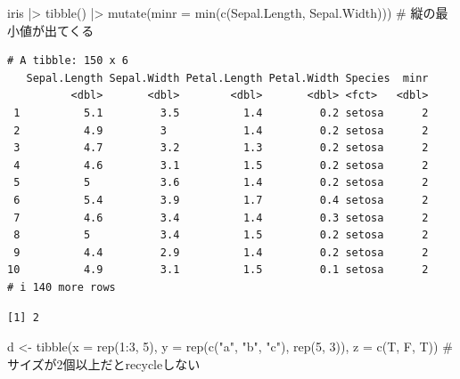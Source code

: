 \documentclass[
  letterpaper,
  DIV=11,
  numbers=noendperiod]{scrreprt}
\newenvironment{Shaded}{\begin{snugshade}}{\end{snugshade}}
\newcommand{\AttributeTok}[1]{\textcolor[rgb]{0.40,0.45,0.13}{#1}}
\newcommand{\CommentTok}[1]{\textcolor[rgb]{0.37,0.37,0.37}{#1}}
\newcommand{\DecValTok}[1]{\textcolor[rgb]{0.68,0.00,0.00}{#1}}
\newcommand{\FunctionTok}[1]{\textcolor[rgb]{0.28,0.35,0.67}{#1}}
\newcommand{\NormalTok}[1]{\textcolor[rgb]{0.00,0.23,0.31}{#1}}
\newcommand{\OtherTok}[1]{\textcolor[rgb]{0.00,0.23,0.31}{#1}}
\newcommand{\SpecialCharTok}[1]{\textcolor[rgb]{0.37,0.37,0.37}{#1}}
\newcommand{\StringTok}[1]{\textcolor[rgb]{0.13,0.47,0.30}{#1}}
\begin{document}
\begin{Shaded}
\begin{Highlighting}[]
\NormalTok{iris }\SpecialCharTok{|\textgreater{}} \FunctionTok{tibble}\NormalTok{() }\SpecialCharTok{|\textgreater{}} \FunctionTok{mutate}\NormalTok{(}\AttributeTok{minr =} \FunctionTok{min}\NormalTok{(}\FunctionTok{c}\NormalTok{(Sepal.Length, Sepal.Width))) }\CommentTok{\# 縦の最小値が出てくる}
\end{Highlighting}
\end{Shaded}

\begin{verbatim}
# A tibble: 150 x 6
   Sepal.Length Sepal.Width Petal.Length Petal.Width Species  minr
          <dbl>       <dbl>        <dbl>       <dbl> <fct>   <dbl>
 1          5.1         3.5          1.4         0.2 setosa      2
 2          4.9         3            1.4         0.2 setosa      2
 3          4.7         3.2          1.3         0.2 setosa      2
 4          4.6         3.1          1.5         0.2 setosa      2
 5          5           3.6          1.4         0.2 setosa      2
 6          5.4         3.9          1.7         0.4 setosa      2
 7          4.6         3.4          1.4         0.3 setosa      2
 8          5           3.4          1.5         0.2 setosa      2
 9          4.4         2.9          1.4         0.2 setosa      2
10          4.9         3.1          1.5         0.1 setosa      2
# i 140 more rows
\end{verbatim}

\begin{Shaded}
\end{Shaded}

\begin{verbatim}
[1] 2
\end{verbatim}

\begin{Shaded}
\begin{Highlighting}[]
\NormalTok{d }\OtherTok{\textless{}{-}} \FunctionTok{tibble}\NormalTok{(}\AttributeTok{x =} \FunctionTok{rep}\NormalTok{(}\DecValTok{1}\SpecialCharTok{:}\DecValTok{3}\NormalTok{, }\DecValTok{5}\NormalTok{), }\AttributeTok{y =} \FunctionTok{rep}\NormalTok{(}\FunctionTok{c}\NormalTok{(}\StringTok{"a"}\NormalTok{, }\StringTok{"b"}\NormalTok{, }\StringTok{"c"}\NormalTok{), }\FunctionTok{rep}\NormalTok{(}\DecValTok{5}\NormalTok{, }\DecValTok{3}\NormalTok{)), }\AttributeTok{z =} \FunctionTok{c}\NormalTok{(T, F, T)) }\CommentTok{\# サイズが2個以上だとrecycleしない}
\end{Highlighting}
\end{Shaded}
\end{document}
